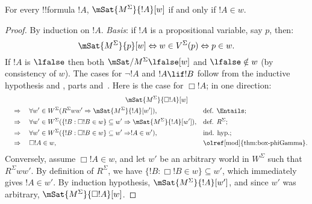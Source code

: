 \documentclass[../../../include/open-logic-section]{subfiles}
\begin{document}


\begin{prop}
  For every !!{formula} $!A$, $\mSat{M^\Sigma}{!A}[w]$ if and only if
  $!A \in w$.
\end{prop}

\begin{proof}
  By induction on $!A$. \emph{Basis}: if $!A$ is a
  propositional variable, say $p$, then:
  \[
  \mSat{M^\Sigma}{p}[w] \Leftrightarrow w \in V^\Sigma(p)
  \Leftrightarrow p \in w.
  \]
  If $!A$ is $\lfalse$ then both $\mSat/{M^\Sigma}{\lfalse}[w]$ and
  $\lfalse \notin w$ (by consistency of $w$). The cases for $\lnot !A$
  and $!A \lif !B$ follow from the inductive hypothesis and
  , parts
  and~. Here is the case for
  $\Box!A$; in one direction:
  \begin{multline*}
  \mSat{M^\Sigma}{\Box!A}[w] \\
    \begin{aligned}
    & \quad \Rightarrow\quad \forall w'\in W^\Sigma (R^\Sigma ww' \Rightarrow \mSat{M^\Sigma}{!A}[w']),
    && \text{def. } \Entails; \\
    & \quad \Rightarrow\quad \forall w' \in W^\Sigma (\{!B :
    \Box!B \in w\}\subseteq w' \Rightarrow \mSat{M^\Sigma}{!A}[w']),
    && \text{def. } R^\Sigma; \\
    & \quad \Rightarrow\quad \forall w' \in W^\Sigma (\{!B :
    \Box!B \in w\}\subseteq w' \Rightarrow !A \in w'),
    && \text{ind. hyp.}; \\
    & \quad \Rightarrow\quad \Box!A \in w, &&
    \text{\olref[mod]{thm:box-phiGamma}}. 
    \end{aligned}
  \end{multline*}
  Conversely, assume $\Box!A \in w$, and let $w'$ be an arbitrary
  world in $W^\Sigma$ such that $R^\Sigma ww'$. By definition of
  $R^\Sigma$, we have $\{ !B : \Box!B \in w\} \subseteq w'$, which
  immediately gives $!A \in w'$. By induction hypothesis,
  $\mSat{M^\Sigma}{!A}[w']$, and since $w'$ was arbitrary,
  $\mSat{M^\Sigma}{\Box!A}[w]$.
\end{proof}
\end{document}
